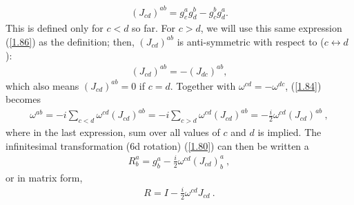\documentclass[aps,reprint,notitlepage,nofootinbib,superscriptaddress]{revtex4-1}
\begin{document}
\begin{align}
   (J_{cd})^{ab}=g_c^a g_d^b-g_c^b g_d^a .\label{1.86}
\end{align}
This is defined only for $c < d$ so far. For $c > d$, we will use this same expression (\eqref{1.86}) as the definition; then, $(J_{cd})^{ab}$ is anti-symmetric with respect to ($c\longleftrightarrow d$):
\begin{align}
    (J_{cd})^{ab}=-(J_{dc})^{ab},
\end{align}
which also means $(J_{cd})^{ab} = 0$ if $c=d$. Together with $\omega^{cd}=-\omega^{dc}$, (\eqref{1.84}) becomes
\begin{align}
    \omega^{ab}=-i\sum_{c<d}\omega^{cd}(J_{cd})^{ab}=-i\sum_{c>d}\omega^{cd}(J_{cd})^{ab}=-\frac{i}{2}\omega^{cd}(J_{cd})^{ab}~,
\end{align}
where in the last expression, sum over all values of $c$ and $d$ is implied. The infinitesimal transformation (6d rotation) (\eqref{1.80}) can then be written a
\begin{align}
    R^a_b=g^a_b-\frac{i}{2}\omega^{cd}(J_{cd})^a_b~,
\end{align}
or in matrix form,
\begin{align}
    R=I-\frac{i}{2}\omega^{cd}J_{cd}~.
\end{align}
\end{document}
